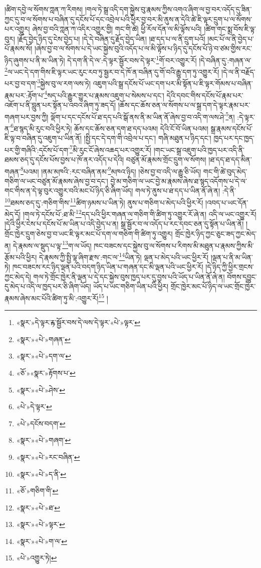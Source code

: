 །ཚིག་དབྱེ་ལ་སོགས་ཀླན་ཀ་རིགས། །གལ་ཏེ་སྒྲ་འདི་དག་སྐྱེས་བུ་རྣམས་ཀྱིས་འགའ་ཞིག་ལ་བྱ་བར་འདོད་དུ་ཟིན་ཀྱང་དུ་བ་ལ་སོགས་པ་བཞིན་དུ་དངོས་པོ་དང་འབྲེལ་པའི་ཕྱིར་བྱ་བར་མི་ནུས་ན་དེའི་ཚེ་ཇི་ལྟར་དྲུག་པ་ལ་སོགས་པར་འགྱུར། ཞེས་བྱ་བའི་ཀླན་ཀ་འདིར་འགྱུར་གྱི། གང་གི་ཚེ། ཕྱི་རོལ་དོན་ལ་མི་ལྟོས་པའི། །ཚིག་གང་སྨྲ་བོས་ཇི་ལྟ་བུར། །རྗོད་བྱེད་ཉིད་དུ་ངེས་བྱེད་པ། །དེ་དེ་བཞིན་དུ་རྗོད་བྱེད་ཡིན། །ཐ་དད་པ་ལ་ནི་དྲུག་པའོ། །མང་པོ་ལ་ནི་བྱེད་པ་པོ་རྣམས་སོ། །ཞེས་བྱ་བ་ལ་སོགས་པ་དེ་ཡང་སྐྱེས་བུའི་འདོད་པ་ལ་མི་ལྟོས་པ་ཉིད་དུ་དངོས་པོ་ཉེ་བ་ཙམ་གྱིས་རང་ཉིད་ཞུགས་པ་ནི་མ་ཡིན་ཏེ། དེ་དག་ནི་དེ་ལ་:དེ་ལྟར་སྦྱོར་བས་དེ་ལྟར་\footnote{«སྣར་»དེ་ལྟར་ྟར་སྦྱོར་བས་དེ་ལས་དེ་ལྟར་«པེ་»ལྟར་}གོ་བར་འགྱུར་རོ། །དེ་བཞིན་དུ་:གཞན་ལ་\footnote{«སྣར་»«པེ་»གཞན་}ལ་ཡང་དེ་དག་གིས་ཇི་ལྟར་ཡང་རུང་རབ་ཏུ་སྦྱར་བ་དེ་ཁོ་ན་བཞིན་དུ་གོ་བའི་རྒྱུ་དག་ཏུ་འགྱུར་རོ། །དེ་ལ་ནི་བརྗོད་པར་བྱ་བ་དག་\footnote{«སྣར་»«པེ་»དག་ལ་}སྐྱེས་བུ་ལ་རག་ལས་ཏེ། འཇུག་པའི་སྒྲ་དངོས་པོ་ཡང་དག་པར་མི་སྟོན་པ་ཇི་ལྟར་གོམས་པ་བཞིན་རྣམ་པར་:རྟོག་པ་\footnote{«ཅོ་»«སྣར་»རྟོགས་པ་}སད་པའི་རྒྱུར་གྱུར་པ་རྣམས་འཇུག་པ་སེམས་པ་དང་། དེའི་དབང་གིས་དངོས་པོ་རྣམ་པར་འཇོག་པ་ནི་བླུན་པར་སྟོན་པ་འབའ་ཞིག་ཏུ་ཟད་དོ། །ཆོས་དང་ཆོས་ཅན་ལ་སོགས་པ་ལ་སྒྲ་དག་དེ་ལྟར་རྣམ་པར་གཞག་པར་བྱས་ཀྱི། ལྡོག་པ་དང་དངོས་པོ་ཐ་དད་པའི་སྒོ་ནས་ནི་མ་ཡིན་ནོ་ཞེས་བྱ་བ་འདི་ག་ལས་ཤེ་\footnote{«སྣར་»«པེ་»ཤེས་}ན། :དེ་ལྟར་ན་\footnote{«པེ་»དེ་ལྟར་}ཐ་སྙད་མི་རུང་བའི་ཕྱིར་ཏེ། ཆོས་དང་ཆོས་ཅན་དག་ཐ་དད་པའམ། དེའི་ངོ་བོ་ཡིན་པའམ། སྒྲ་རྣམས་དངོས་པོ་ཇི་ལྟ་བ་བཞིན་དུ་འཇུག་པ་ཡིན་ནོ། །སྤྱི་དང་དེ་དག་གི་འབྲེལ་པ་དང་། གཞི་མཐུན་པ་ཉིད་དང་། ཁྱད་པར་དང་ཁྱད་པར་གྱི་གཞིའི་:དངོས་པོ་དག་\footnote{«པེ་»དངོས་བདག་}མི་རུང་ངོ་ཞེས་འཆད་པར་འགྱུར་རོ། །གང་ཡང་སྒྲ་འཇུག་པའི་ཁྱད་པར་འདི་ནི་ཐམས་ཅད་དུ་དངོས་པོས་བྱས་པ་ཁོ་ནར་འདོད་པ་དེའི། བཙུན་མོ་རྣམས་གྲོང་དྲུག་ལ་སོགས། །ཐ་དད་ཐ་དད་མིན་གཞན་\footnote{«སྣར་»«པེ་»གཞག་}པའམ། །ནམ་མཁའི་:རང་བཞིན་ནམ་\footnote{«སྣར་»«པེ་»རང་བཞིན་}མཁའ་ཉིད། །ཅེས་བྱ་བ་འདི་ལ་རྒྱུ་ཅི་ཡོད། གང་གི་ཚེ་བུད་མེད་གཅིག་ལ་ཡང་བཙུན་མོ་རྣམས་ཞེས་བྱ་བ་དང་། བྱེ་མ་གཅིག་ལ་ཡང་བྱེ་མ་རྣམས་ཞེས་ཐ་སྙད་འདོགས་པ་དེ་ལ་གང་གིས་ན་དེ་ལྟ་བུར་འགྱུར་བའི་མང་པོ་ཉིད་ཅི་ཞིག་ཡོད། གལ་ཏེ་ནུས་པ་ཐ་དད་པ་ཡིན་ནོ་ཞེ་ན། :དེ་ནི་\footnote{«སྣར་»«པེ་»ད་ནི་}ཐམས་ཅད་དུ་:གཅིག་གིས་\footnote{«ཅོ་»གཅིག་གི་}ཚིག་ཉམས་པ་ཡིན་ཏེ། ནུས་པ་གཅིག་པ་མེད་པའི་ཕྱིར་རོ། །འབད་པ་ཡང་དོན་མེད་དོ། །གལ་ཏེ་དངོས་པོ་:ཐ་མི་\footnote{«སྣར་»«པེ་»ཐ་}དད་པའི་ཕྱིར་གཞན་ལ་གཅིག་གི་ཚིག་ཏུ་འགྱུར་རོ་ཞེ་ན། འདི་ལ་ཡང་འགྱུར་རོ། །དེའི་ཕྱིར་ངེས་པ་དངོས་པོ་མ་ཡིན་པ་འདི་བྱེད་པ་ན། སྒྲ་སྦྱོར་བ་ལ་འདོད་པ་རང་དབང་ཅན་དུ་སྟོན་པ་ཡིན་ནོ། །གྲོང་ཁྱེར་དྲུག་ཅེས་བྱ་བ་ཡང་ཇི་ལྟར་མང་པོ་དག་ལ་གཅིག་གི་ཚིག་ཏུ་འགྱུར། གྲོང་ཁྱེར་ཉིད་ཀྱང་ཅུང་ཟད་ཀྱང་མེད་ན། དེ་རྣམས་ལ་སྡུད་པ་ལྟ་\footnote{«སྣར་»«པེ་»ལྟར་}ག་ལ་ཡོད། ཁང་བཟངས་དང་སྐྱེས་བུ་ལ་སོགས་པ་རིགས་མི་མཐུན་པ་རྣམས་ཀྱིས་མི་རྩོམ་པའི་ཕྱིར། དེ་རྣམས་ཀྱི་སྤྱི་ལྟ་ཞིག་རྫས་:གང་ལ་\footnote{«སྣར་»«པེ་»ག་ལ་}ཡིན་ཏེ། ལྡན་པ་མེད་པའི་ཡང་ཕྱིར་རོ། །ལྡན་པ་ནི་མ་ཡིན་ཏེ། ཁང་བཟངས་རང་ཉིད་ལྡན་པའི་བདག་ཉིད་ཡིན་པ་གཞན་དང་མི་ལྡན་པའི་ཡང་ཕྱིར་རོ། །དེ་ཉིད་ཀྱི་ཕྱིར་གྲངས་ཀྱང་མེད་དེ། གལ་ཏེ་གྲོང་ཁྱེར་ནི་ལྡན་པ་དེ་དང་སྐྱེས་བུས་ཁྱད་པར་དུ་བྱས་པའི་ཡོད་པ་ཡིན་ནོ་ཞེ་ན། བོགས་དབྱུང་དུ་མེད་པ་འདི་ལ་ཁྱད་པར་ཅི་ཞིག་ཡོད། ཡོད་པ་ཡང་གཅིག་ཡིན་པའི་ཕྱིར། གྲོང་ཁྱེར་མང་པོ་ཉིད་ལ་ཡང་གྲོང་ཁྱེར་རྣམས་ཞེས་མང་པོའི་ཚིག་ཏུ་མི་:འགྱུར་རོ།\footnote{«པེ་»འགྱུར་ཏེ།} །
